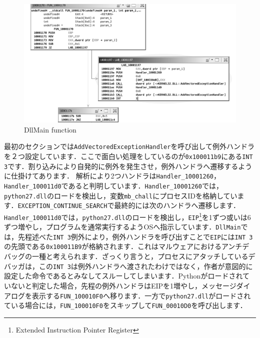\begin{figure}[H]
    \centering
    \includegraphics[width=\linewidth]{./assets/takuzoo3868asset/ghidra_002_gray.png}
    \caption{DllMain function}
    \label{fig:ghdra_002}
\end{figure}
最初のセクションでは\texttt{AddVectoredExceptionHandler}を呼び出して例外ハンドラを２つ設定しています．ここで面白い処理をしているのが\texttt{0x100011b9}にある\texttt{INT 3}です．割り込みにより自発的に例外を発生させ，例外ハンドラへ遷移するように仕掛けてあります． 解析により2つハンドラは\texttt{Handler\_10001260}，\texttt{Handler\_100011d0}であると判明しています．\texttt{Handler\_10001260}では，\texttt{python27.dll}のロードを検出し，変数\texttt{mb\_chall}にプロセスIDを格納しています．\texttt{EXCEPTION\_CONTINUE\_SEARCH}で最終的には次のハンドラへ遷移します．\texttt{Handler\_100011d0}では，\texttt{python27.dll}のロードを検出し，\texttt{EIP}\footnote{Extended Instruction Pointer Register}を1ずつ或いは6ずつ増やし，プログラムを通常実行するようOSへ指示しています．\texttt{DllMain}では，先程述べた\texttt{INT 3}例外により，例外ハンドラを呼び出すことで\texttt{EIP}には\texttt{INT 3}の先頭である\texttt{0x100011B9}が格納されます．これはマルウェアにおけるアンチデバッグの一種と考えられます．ざっくり言うと，プロセスにアタッチしているデバッガは，この\texttt{INT 3}は例外ハンドラへ渡されたわけではなく，作者が意図的に設定した命令であるとみなしてスルーしてしまいます．Pythonがロードされていないと判定した場合，先程の例外ハンドラはEIPを1増やし，メッセージダイアログを表示する\texttt{FUN\_100010F0}へ移ります．一方で\texttt{python27.dll}がロードされている場合には，\texttt{FUN\_100010F0}をスキップして\texttt{FUN\_00010D0}を呼び出します．
